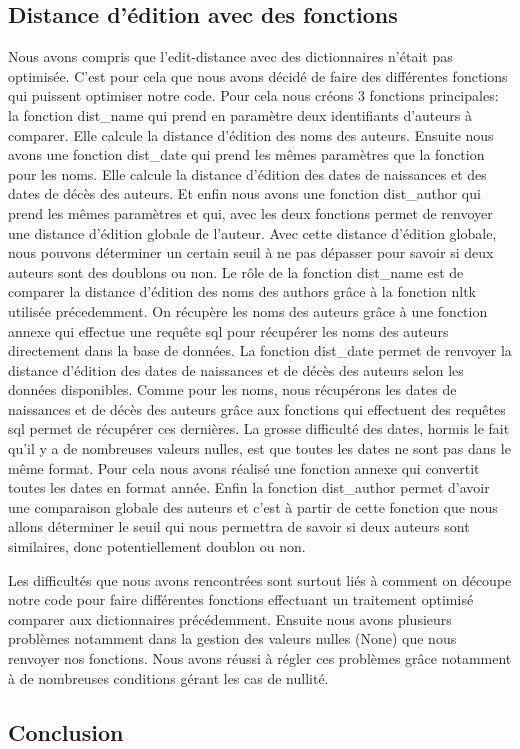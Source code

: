 \documentclass[12pt, a4paper]{article}
\begin{document}
\subsection{Distance d'édition avec des fonctions}
Nous avons compris que l'edit-distance avec des dictionnaires n'était pas optimisée. C'est pour cela que nous avons décidé de faire des différentes fonctions qui puissent optimiser notre code. Pour cela nous créons 3 fonctions principales: la fonction dist\_name qui prend en paramètre deux identifiants d'auteurs à comparer. Elle calcule la distance d'édition des noms des auteurs. Ensuite nous avons une fonction dist\_date qui prend les mêmes paramètres que la fonction pour les noms. Elle calcule la distance d'édition des dates de naissances et des dates de décès des auteurs. Et enfin nous avons une fonction dist\_author qui prend les mêmes paramètres et qui, avec les deux fonctions permet de renvoyer une distance d'édition globale de l'auteur. Avec cette distance d'édition globale, nous pouvons déterminer un certain seuil à ne pas dépasser pour savoir si deux auteurs sont des doublons ou non. Le rôle de la fonction dist\_name est de comparer la distance d'édition des noms des authors grâce à la fonction nltk utilisée précedemment. On récupère les noms des auteurs grâce à une fonction annexe qui effectue une requête sql pour récupérer les noms des auteurs directement dans la base de données. La fonction dist\_date permet de renvoyer la distance d'édition des dates de naissances et de décès des auteurs selon les données disponibles. Comme pour les noms, nous récupérons les dates de naissances et de décès des auteurs grâce aux fonctions qui effectuent des requêtes sql permet de récupérer ces dernières. La grosse difficulté des dates, hormis le fait qu'il y a de nombreuses valeurs nulles, est que toutes les dates ne sont pas dans le même format. Pour cela nous avons réalisé une fonction annexe qui convertit toutes les dates en format année. Enfin la fonction dist\_author permet d'avoir une comparaison globale des auteurs et c'est à partir de cette fonction que nous allons déterminer le seuil qui nous permettra de savoir si deux auteurs sont similaires, donc potentiellement doublon ou non.

Les difficultés que nous avons rencontrées sont surtout liés à comment on découpe notre code pour faire différentes fonctions effectuant un traitement optimisé comparer aux dictionnaires précédemment. Ensuite nous avons plusieurs problèmes notamment dans la gestion des valeurs nulles (None) que nous renvoyer nos fonctions. Nous avons réussi à régler ces problèmes grâce notamment à de nombreuses conditions gérant les cas de nullité.


\subsection{Conclusion}

\cite{Fan15}
\cite{galhardas:inria-00072476}
\cite{10.5555/1841211}



\end{document}
